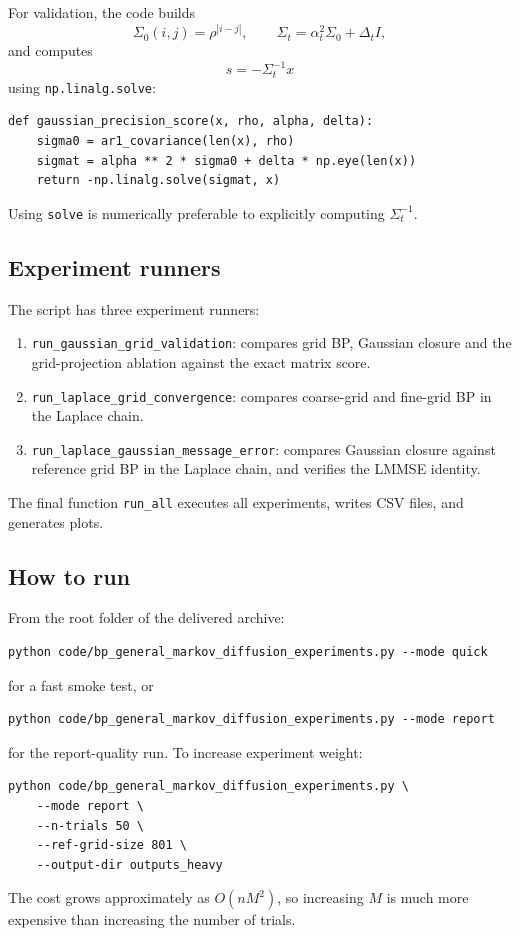 \documentclass[11pt]{article}
\begin{document}
For validation, the code builds
\begin{equation}
  \Sigma_0(i,j)=\rho^{|i-j|},
  \qquad
  \Sigma_t=\alpha_t^2\Sigma_0+\Delta_t I,
\end{equation}
and computes
\begin{equation}
  s=-\Sigma_t^{-1}x
\end{equation}
using \texttt{np.linalg.solve}:
\begin{lstlisting}[style=pythonstyle]
def gaussian_precision_score(x, rho, alpha, delta):
    sigma0 = ar1_covariance(len(x), rho)
    sigmat = alpha ** 2 * sigma0 + delta * np.eye(len(x))
    return -np.linalg.solve(sigmat, x)
\end{lstlisting}
Using \texttt{solve} is numerically preferable to explicitly computing \(\Sigma_t^{-1}\).

\subsection{Experiment runners}

The script has three experiment runners:
\begin{enumerate}[label=\arabic*.]
  \item \texttt{run\_gaussian\_grid\_validation}: compares grid BP, Gaussian closure and the grid-projection ablation against the exact matrix score.
  \item \texttt{run\_laplace\_grid\_convergence}: compares coarse-grid and fine-grid BP in the Laplace chain.
  \item \texttt{run\_laplace\_gaussian\_message\_error}: compares Gaussian closure against reference grid BP in the Laplace chain, and verifies the LMMSE identity.
\end{enumerate}
The final function \texttt{run\_all} executes all experiments, writes CSV files, and generates plots.

\subsection{How to run}

From the root folder of the delivered archive:
\begin{lstlisting}[style=pythonstyle]
python code/bp_general_markov_diffusion_experiments.py --mode quick
\end{lstlisting}
for a fast smoke test, or
\begin{lstlisting}[style=pythonstyle]
python code/bp_general_markov_diffusion_experiments.py --mode report
\end{lstlisting}
for the report-quality run. To increase experiment weight:
\begin{lstlisting}[style=pythonstyle]
python code/bp_general_markov_diffusion_experiments.py \
    --mode report \
    --n-trials 50 \
    --ref-grid-size 801 \
    --output-dir outputs_heavy
\end{lstlisting}
The cost grows approximately as \(O(nM^2)\), so increasing \(M\) is much more expensive than increasing the number of trials.
\end{document}
